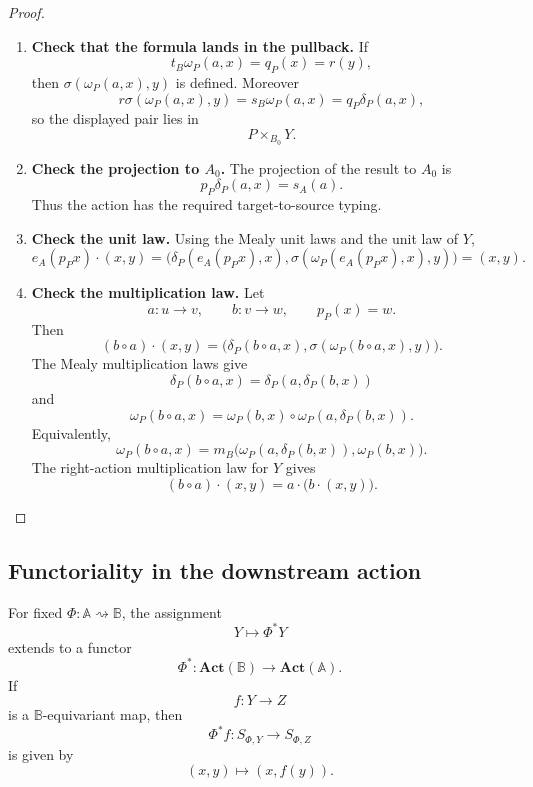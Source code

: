 \begin{proof}
\leavevmode
\begin{enumerate}
\item \textbf{Check that the formula lands in the pullback.}
If
\[
t_B\omega_P(a,x)=q_P(x)=r(y),
\]
then \(\sigma(\omega_P(a,x),y)\) is defined. Moreover
\[
r\sigma(\omega_P(a,x),y)
=
s_B\omega_P(a,x)
=
q_P\delta_P(a,x),
\]
so the displayed pair lies in
\[
P\times_{B_0}Y.
\]

\item \textbf{Check the projection to \(A_0\).}
The projection of the result to \(A_0\) is
\[
p_P\delta_P(a,x)=s_A(a).
\]
Thus the action has the required target-to-source typing.

\item \textbf{Check the unit law.}
Using the Mealy unit laws and the unit law of \(Y\),
\[
e_A(p_Px)\cdot(x,y)
=
\bigl(
\delta_P(e_A(p_Px),x),
\sigma(\omega_P(e_A(p_Px),x),y)
\bigr)
=
(x,y).
\]

\item \textbf{Check the multiplication law.}
Let
\[
a:u\to v,
\qquad
b:v\to w,
\qquad
p_P(x)=w.
\]
Then
\[
(b\circ a)\cdot(x,y)
=
\bigl(
\delta_P(b\circ a,x),
\sigma(\omega_P(b\circ a,x),y)
\bigr).
\]
The Mealy multiplication laws give
\[
\delta_P(b\circ a,x)
=
\delta_P(a,\delta_P(b,x))
\]
and
\[
\omega_P(b\circ a,x)
=
\omega_P(b,x)\circ\omega_P(a,\delta_P(b,x)).
\]
Equivalently,
\[
\omega_P(b\circ a,x)
=
m_B\bigl(
\omega_P(a,\delta_P(b,x)),
\omega_P(b,x)
\bigr).
\]
The right-action multiplication law for \(Y\) gives
\[
(b\circ a)\cdot(x,y)
=
a\cdot\bigl(b\cdot(x,y)\bigr).
\]
\end{enumerate}
\end{proof}

\subsection{Functoriality in the downstream action}
\label{subsec:relative-functoriality-downstream-action}

\begin{proposition}
\label{prop:relative-functoriality-downstream-action}
For fixed \(\Phi:\mathbb A\rightsquigarrow\mathbb B\), the assignment
\[
Y\longmapsto \Phi^\ast Y
\]
extends to a functor
\[
\Phi^\ast:\mathbf{Act}(\mathbb B)\to\mathbf{Act}(\mathbb A).
\]
If
\[
f:Y\to Z
\]
is a \(\mathbb B\)-equivariant map, then
\[
\Phi^\ast f:S_{\Phi,Y}\to S_{\Phi,Z}
\]
is given by
\[
(x,y)\longmapsto(x,f(y)).
\]
\end{proposition}


